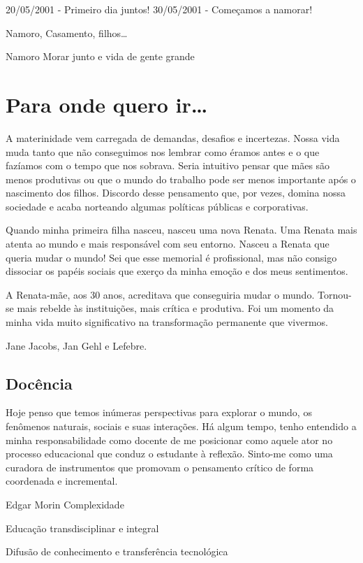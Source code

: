 \documentclass[
]{book}
\begin{document}
20/05/2001 - Primeiro dia juntos! 30/05/2001 - Começamos a namorar!

Namoro, Casamento, filhos\ldots{}

Namoro Morar junto e vida de gente grande

\hypertarget{para-onde-quero-ir}{%
\chapter{Para onde quero ir\ldots{}}\label{para-onde-quero-ir}}

A materinidade vem carregada de demandas, desafios e incertezas. Nossa
vida muda tanto que não conseguimos nos lembrar como éramos antes e o
que fazíamos com o tempo que nos sobrava. Seria intuitivo pensar que
mães são menos produtivas ou que o mundo do trabalho pode ser menos
importante após o nascimento dos filhos. Discordo desse pensamento que,
por vezes, domina nossa sociedade e acaba norteando algumas políticas
públicas e corporativas.

Quando minha primeira filha nasceu, nasceu uma nova Renata. Uma Renata
mais atenta ao mundo e mais responsável com seu entorno. Nasceu a Renata
que queria mudar o mundo! Sei que esse memorial é profissional, mas não
consigo dissociar os papéis sociais que exerço da minha emoção e dos
meus sentimentos.

A Renata-mãe, aos 30 anos, acreditava que conseguiria mudar o mundo.
Tornou-se mais rebelde às instituições, mais crítica e produtiva. Foi um
momento da minha vida muito significativo na transformação permanente
que vivermos.

Jane Jacobs, Jan Gehl e Lefebre.

\hypertarget{docuxeancia}{%
\section{Docência}\label{docuxeancia}}

Hoje penso que temos inúmeras perspectivas para explorar o mundo, os
fenômenos naturais, sociais e suas interações. Há algum tempo, tenho
entendido a minha responsabilidade como docente de me posicionar como
aquele ator no processo educacional que conduz o estudante à reflexão.
Sinto-me como uma curadora de instrumentos que promovam o pensamento
crítico de forma coordenada e incremental.

Edgar Morin Complexidade

Educação transdisciplinar e integral

Difusão de conhecimento e transferência tecnológica
\end{document}
